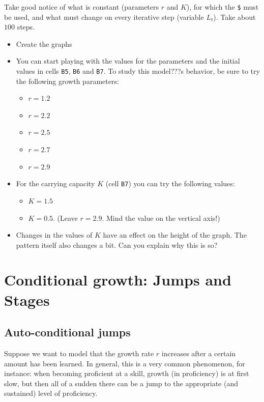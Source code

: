 \documentclass[]{book}
\providecommand{\tightlist}{%
  \setlength{\itemsep}{0pt}\setlength{\parskip}{0pt}}
\let\stdsection\section
\renewcommand\section{\newpage\stdsection}
\begin{document}
Take good notice of what is constant (parameters \(r\) and \(K\)), for
which the \texttt{\$} must be used, and what must change on every
iterative step (variable \(L_t\)). Take about \(100\) steps.

\begin{itemize}
\tightlist
\item
  Create the graphs
\item
  You can start playing with the values for the parameters and the
  initial values in cells \texttt{B5}, \texttt{B6} and \texttt{B7}. To
  study this model???s behavior, be sure to try the following growth
  parameters:

  \begin{itemize}
  \tightlist
  \item
    \(r = 1.2\)
  \item
    \(r = 2.2\)
  \item
    \(r = 2.5\)
  \item
    \(r = 2.7\)
  \item
    \(r = 2.9\)
  \end{itemize}
\item
  For the carrying capacity \(K\) (cell \texttt{B7}) you can try the
  following values:

  \begin{itemize}
  \tightlist
  \item
    \(K = 1.5\)
  \item
    \(K = 0.5\). (Leave \(r = 2.9\). Mind the value on the vertical
    axis!)
  \end{itemize}
\item
  Changes in the values of \(K\) have an effect on the height of the
  graph. The pattern itself also changes a bit. Can you explain why this
  is so?
\end{itemize}

\section{Conditional growth: Jumps and
Stages}\label{conditional-growth-jumps-and-stages}

\subsection*{Auto-conditional jumps}\label{auto-conditional-jumps}

Suppose we want to model that the growth rate \(r\) increases after a
certain amount has been learned. In general, this is a very common
phenomenon, for instance: when becoming proficient at a skill, growth
(in proficiency) is at first slow, but then all of a sudden there can be
a jump to the appropriate (and sustained) level of proficiency.
\end{document}
